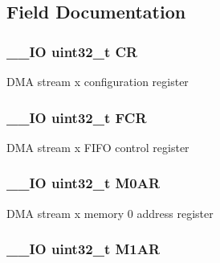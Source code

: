 \subsection{Field Documentation}
\hypertarget{struct_d_m_a___stream___type_def_ab40c89c59391aaa9d9a8ec011dd0907a}{
\subsubsection[{C\-R}]{\setlength{\rightskip}{0pt plus 5cm}\-\_\-\-\_\-\-I\-O uint32\-\_\-t C\-R}}\label{struct_d_m_a___stream___type_def_ab40c89c59391aaa9d9a8ec011dd0907a}
D\-M\-A stream x configuration register \hypertarget{struct_d_m_a___stream___type_def_a5d5cc7f32884945503dd29f8f6cbb415}{
\subsubsection[{F\-C\-R}]{\setlength{\rightskip}{0pt plus 5cm}\-\_\-\-\_\-\-I\-O uint32\-\_\-t F\-C\-R}}\label{struct_d_m_a___stream___type_def_a5d5cc7f32884945503dd29f8f6cbb415}
D\-M\-A stream x F\-I\-F\-O control register \hypertarget{struct_d_m_a___stream___type_def_a63b4d166f4ab5024db6b493a7ab7b640}{
\subsubsection[{M0\-A\-R}]{\setlength{\rightskip}{0pt plus 5cm}\-\_\-\-\_\-\-I\-O uint32\-\_\-t M0\-A\-R}}\label{struct_d_m_a___stream___type_def_a63b4d166f4ab5024db6b493a7ab7b640}
D\-M\-A stream x memory 0 address register \hypertarget{struct_d_m_a___stream___type_def_aee7782244ceb4791d9a3891804ac47ac}{
\subsubsection[{M1\-A\-R}]{\setlength{\rightskip}{0pt plus 5cm}\-\_\-\-\_\-\-I\-O uint32\-\_\-t M1\-A\-R}}\label{struct_d_m_a___stream___type_def_aee7782244ceb4791d9a3891804ac47ac}
